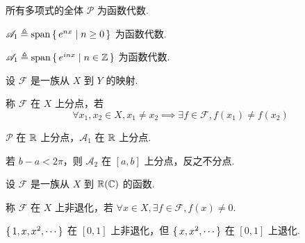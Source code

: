 \begin{example}
    所有多项式的全体 $\mathscr{P}$ 为函数代数.
\end{example}

\begin{example}
    $\mathscr{A}_1\triangleq\mathrm{span}\set{e^{nx}|n\ge 0}$ 为函数代数.
\end{example}

\begin{example}
    $\mathscr{A}_1\triangleq\mathrm{span}\set{e^{inx}|n\in\mathbb{Z}}$ 为函数代数.
\end{example}

\begin{definition}
    设 $\mathscr{F}$ 是一族从 $X$ 到 $Y$ 的映射.

    称 $\mathscr{F}$ 在 $X$ 上分点，若
$$
\forall x_1,x_2\in X,x_1\ne x_2\implies\exists f\in\mathscr{F},f(x_1)\ne f(x_2)
$$
\end{definition}

\begin{example}
    $\mathscr{P}$ 在 $\mathbb{R}$ 上分点，$\mathscr{A}_1$ 在 $\mathbb{R}$ 上分点.

    若 $b-a<2\pi$，则 $\mathscr{A}_2$ 在 $[a,b]$ 上分点，反之不分点.
\end{example}

\begin{definition}
    设 $\mathscr{F}$ 是一族从 $X$ 到 $\mathbb{R}(\mathbb{C})$ 的函数.

    称 $\mathscr{F}$ 在 $X$ 上非退化，若 $\forall x\in X,\exists f\in\mathscr{F},f(x)\ne 0$.
\end{definition}

\begin{example}
    $\set{1,x,x^2,\cdots}$ 在 $[0,1]$ 上非退化，但 $\set{x,x^2,\cdots}$ 在 $[0,1]$ 上退化.
\end{example}

